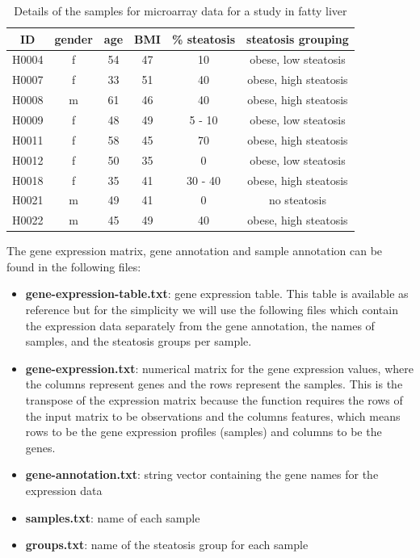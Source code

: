 \documentclass[11pt, oneside]{article}   	%
\begin{document}
\begin{table}[h]
	\centering
	\caption{Details of the samples for microarray data for a study in fatty liver \cite{Wruck2015}}
	\begin{tabular}{c | c | c | c | c | c}
		\hline
		ID & gender & age & BMI & \% steatosis & steatosis grouping \\
		\hline
                H0004 & f & 54 & 47 & 10 & obese, low steatosis \\
                H0007 & f & 33 & 51 & 40 & obese, high steatosis \\
                H0008 & m & 61 & 46 & 40 & obese, high steatosis \\
                H0009 & f & 48 & 49 & 5 - 10 & obese, low steatosis \\
                H0011 & f & 58 & 45 & 70 & obese, high steatosis \\
                H0012 & f & 50 & 35 & 0 & obese, low steatosis \\
                H0018 & f & 35 & 41 & 30 - 40 & obese, high steatosis \\
                H0021 & m & 49 & 41 & 0 & no steatosis \\
                H0022 & m & 45 & 49 & 40 & obese, high steatosis
		\label{tab:ExpressionDataWruck}
	\end{tabular}
\end{table}


The gene expression matrix, gene annotation and sample annotation can be found in the following files:

\begin{itemize}
   \item {\bf gene-expression-table.txt}: gene expression table. This table is available as reference but for the simplicity we will use the following files which contain the expression data separately from the gene annotation, the names of samples, and the steatosis groups per sample.
   \item {\bf gene-expression.txt}: numerical matrix for the gene expression values, where the columns represent genes and the rows represent the samples. This is the transpose of the expression matrix because the function requires the rows of the input matrix to be observations and the columns features, which means rows to be the gene expression profiles (samples) and columns to be the genes.
   \item {\bf gene-annotation.txt}: string vector containing the gene names for the expression data
   \item {\bf samples.txt}: name of each sample
   \item {\bf groups.txt}: name of the steatosis group for each sample
\end{itemize}
\end{document}
